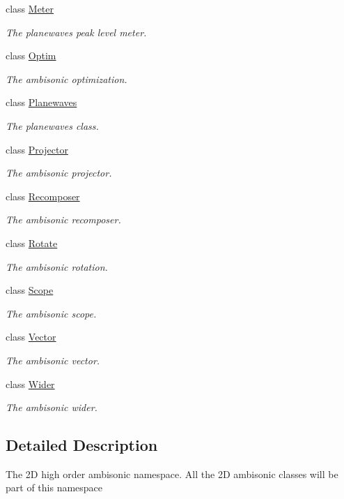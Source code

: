 \begin{DoxyCompactItemize}
class \hyperlink{class_hoa2_d_1_1_meter}{Meter}
\begin{DoxyCompactList}\small\item\em The planewaves peak level meter. \end{DoxyCompactList}\item 
class \hyperlink{class_hoa2_d_1_1_optim}{Optim}
\begin{DoxyCompactList}\small\item\em The ambisonic optimization. \end{DoxyCompactList}\item 
class \hyperlink{class_hoa2_d_1_1_planewaves}{Planewaves}
\begin{DoxyCompactList}\small\item\em The planewaves class. \end{DoxyCompactList}\item 
class \hyperlink{class_hoa2_d_1_1_projector}{Projector}
\begin{DoxyCompactList}\small\item\em The ambisonic projector. \end{DoxyCompactList}\item 
class \hyperlink{class_hoa2_d_1_1_recomposer}{Recomposer}
\begin{DoxyCompactList}\small\item\em The ambisonic recomposer. \end{DoxyCompactList}\item 
class \hyperlink{class_hoa2_d_1_1_rotate}{Rotate}
\begin{DoxyCompactList}\small\item\em The ambisonic rotation. \end{DoxyCompactList}\item 
class \hyperlink{class_hoa2_d_1_1_scope}{Scope}
\begin{DoxyCompactList}\small\item\em The ambisonic scope. \end{DoxyCompactList}\item 
class \hyperlink{class_hoa2_d_1_1_vector}{Vector}
\begin{DoxyCompactList}\small\item\em The ambisonic vector. \end{DoxyCompactList}\item 
class \hyperlink{class_hoa2_d_1_1_wider}{Wider}
\begin{DoxyCompactList}\small\item\em The ambisonic wider. \end{DoxyCompactList}\end{DoxyCompactItemize}


\subsection{Detailed Description}
The 2\-D high order ambisonic namespace. All the 2\-D ambisonic classes will be part of this namespace 
